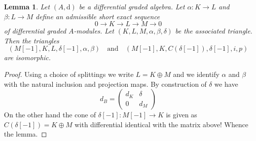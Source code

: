 \documentclass{stacks-project}
\theoremstyle{plain}
\newtheorem{lemma}[subsection]{Lemma}
\theoremstyle{definition}
\theoremstyle{remark}
\numberwithin{equation}{subsection}
\begin{document}
\begin{lemma}
\label{lemma-rotate-triangle}
Let $(A, \text{d})$ be a differential graded algebra.
Let $\alpha : K \to L$ and $\beta : L \to M$
define an admissible short exact sequence
$$
0 \to K \to L \to M \to 0
$$
of differential graded $A$-modules.
Let $(K, L, M, \alpha, \beta, \delta)$
be the associated triangle. Then the triangles
$$
(M[-1], K, L, \delta[-1], \alpha, \beta)
\quad\text{and}\quad
(M[-1], K, C(\delta[-1]), \delta[-1], i, p)
$$
are isomorphic.
\end{lemma}

\begin{proof}
Using a choice of splittings we write $L = K \oplus M$ and we identify
$\alpha$ and $\beta$ with the natural inclusion and projection maps.
By construction of $\delta$ we have
$$
d_B =
\left(
\begin{matrix}
d_K & \delta \\
0 & d_M
\end{matrix}
\right)
$$
On the other hand the cone of $\delta[-1] : M[-1] \to K$
is given as $C(\delta[-1]) = K \oplus M$ with differential identical
with the matrix above! Whence the lemma.
\end{proof}
\end{document}
